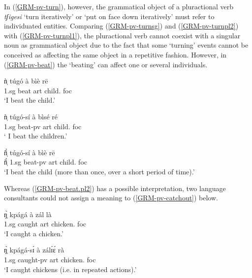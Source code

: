 \begin{exe}
\begin{exe}
\begin{exe}
{\begin{exe}
\begin{exe}
\begin{exe}
\begin{exe}
\begin{exe}
\begin{exe}
\begin{exe}
\begin{xlist}
\begin{exe}
\begin{exe}
\begin{exe}
\begin{exe}
\begin{exe}
\begin{exe}
\begin{exe}
\begin{exe}
\begin{exe}
\begin{exe}
\begin{exe}
\begin{exe}
\begin{exe}
\begin{exe}
\begin{exe}
In (\ref{GRM-pv-turn}), however,  the 
grammatical object of a
pluractional verb {\it tʃigesi} `turn iteratively' or `put on face
down iteratively'  must refer to individuated entities. Comparing  
(\ref{GRM-pv-turnsg}) and (\ref{GRM-pv-turnpl2}) with 
(\ref{GRM-pv-turnpl1}),   the pluractional verb cannot coexist with a singular
noun as grammatical object due to the fact that  some `turning' events cannot be
conceived as affecting the same object in a repetitive fashion. However, in
(\ref{GRM-pv-beat}) the `beating' can affect  one or several
individuals. 


\ea\label{GRM-pv-beat}
  
    \ea\label{GRM-pv-beat.sg}
\gll   ǹ̩   túgó  à bìè  rē  \\
            {\sc 1.sg}  {beat} {\sc art} {child.\sg} {\sc foc}\\
\glt `I beat the child.'

\ex\label{GRM-pv-beat.pl1}
\gll   ǹ̩    túgó-sí  à bìsé  ré   \\
         {\sc 1.sg}   {beat-{\sc pv}} {\sc art} {child.\pl} {\sc foc}\\
\glt ` I beat the children.'


\ex\label{GRM-pv-beat.pl2}
\gll    ñ̩̀    túgó-sí  à  bìè  rē   \\
          ñ̩̀  {\sc 1.sg}    {beat-{\sc pv}} {\sc art}  {child.\sg} {\sc foc} 
\\
\glt `I beat the child (more than once, over a short period of time).'


 
\z 
 \z

Whereas  (\ref{GRM-pv-beat.pl2})
has a possible interpretation, two language consultants
could not assign a meaning to (\ref{GRM-pv-catchout}) below. 




\ea\label{GRM-pv-catch}
  
    \ea\label{GRM-pv-catchsg}
\gll    ŋ̩̀  kpágá  à  zál  là  \\
         {\sc 1.sg}   {caught} {\sc art} {chicken.\sg} {\sc foc}\\
\glt `I caught a chicken.'


 \ex\label{GRM-pv-catchpl1}
\gll    ŋ̩̀    kpágá-sɪ́  à  zálɪ́ɛ́ rà  \\
       {\sc 1.sg} {caught-{\sc pv}} {\sc art} {chicken.\pl} {\sc foc}\\
\glt `I caught chickens (i.e. in repeated actions).'



\end{exe}
\end{exe}
\end{exe}
\end{exe}
\end{exe}
\end{exe}
\end{exe}
\end{exe}
\end{exe}
\end{exe}
\end{exe}
\end{exe}
\end{exe}
\end{exe}
\end{exe}
\end{xlist}
\end{exe}
\end{exe}
\end{exe}
\end{exe}
\end{exe}
\end{exe}
\end{exe}}
\end{exe}
\end{exe}
\end{exe}
